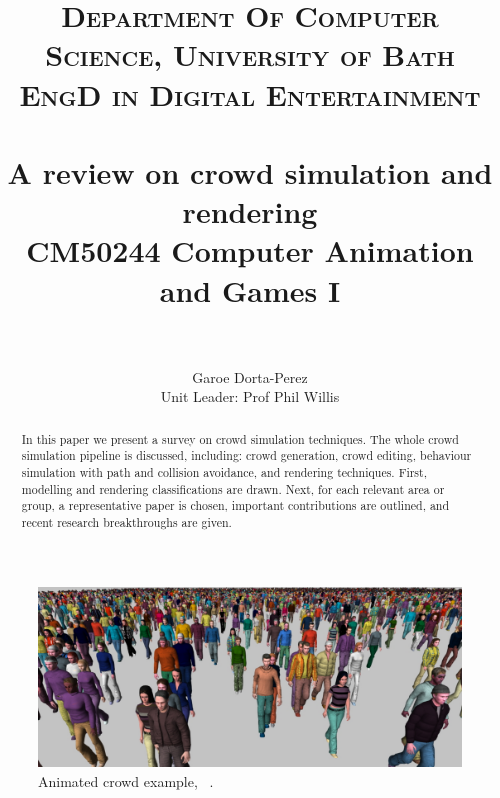 \documentclass[6pt]{article} %
\title{	
\normalfont \normalsize 
\textsc{Department Of Computer Science, University of Bath} \\ [5pt] %
\textsc{EngD in Digital Entertainment} \\ [5pt] 
\horrule{0.7pt} \\[0.2cm] %
\Huge A review on crowd simulation and rendering \\ %
\vspace{7 mm}
\Large CM50244 \: Computer Animation and Games I \\
\horrule{0.7pt} \\[0.0cm] %
}
\author{Garoe Dorta-Perez \\ \Large Unit Leader: Prof Phil Willis \\}  %
\begin{document}
\vspace*{\fill}
\begin{center}
	\begin{minipage}{1.0\textwidth}
		\maketitle %
		\thispagestyle{empty}
	\end{minipage}
\end{center}



\vfill %
\begin{abstract}
\normalsize %
In this paper we present a survey on crowd simulation techniques.
The whole crowd simulation pipeline is discussed, including: crowd generation, crowd editing, behaviour simulation with path and collision avoidance, and rendering techniques.
First, modelling and rendering classifications are drawn.
Next, for each relevant area or group, a representative paper is chosen, important contributions are outlined, and recent research breakthroughs are given.
\end{abstract}
\vfill %

\clearpage %



\begin{figure}
		\centering
		\includegraphics[scale=0.3]{images/crowd2}
		\caption{Animated crowd example, ~\cite{ruiz2013}.}
\end{figure}
\end{document}
